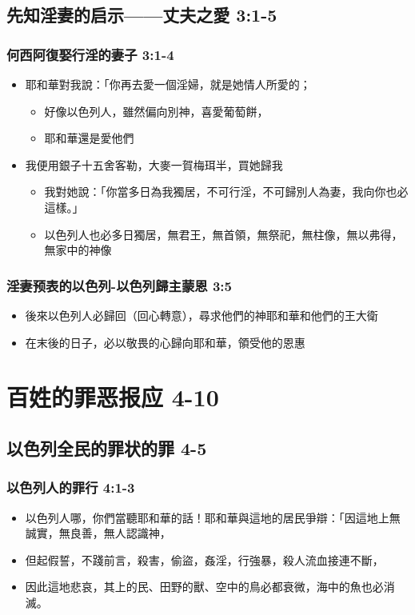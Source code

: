 \subsection{先知淫妻的启示——丈夫之愛 3:1-5}
\subsubsection{何西阿復娶行淫的妻子 3:1-4}
\begin{itemize}
\itemsep-.45em  
\item 耶和華對我說：「你再去愛一個淫婦，就是她情人所愛的；
\begin{itemize}
\itemsep-.45em  
\item 好像以色列人，雖然偏向別神，喜愛葡萄餅，
\item 耶和華還是愛他們
\end{itemize}
\item 我便用銀子十五舍客勒，大麥一賀梅珥半，買她歸我
\begin{itemize}
\itemsep-.45em  
\item 我對她說：「你當多日為我獨居，不可行淫，不可歸別人為妻，我向你也必這樣。」
\item 以色列人也必多日獨居，無君王，無首領，無祭祀，無柱像，無以弗得，無家中的神像
\end{itemize}
\end{itemize}


\subsubsection{淫妻预表的以色列-以色列歸主蒙恩 3:5}
\begin{itemize}
\itemsep-.45em  
\item 後來以色列人必歸回（回心轉意），尋求他們的神耶和華和他們的王大衛
\item 在末後的日子，必以敬畏的心歸向耶和華，領受他的恩惠
\end{itemize}


\section{百姓的罪恶报应 4-10}
\subsection{以色列全民的罪状的罪 4-5}
\subsubsection{以色列人的罪行 4:1-3}
\begin{itemize}
\itemsep-.45em  
\item 以色列人哪，你們當聽耶和華的話！耶和華與這地的居民爭辯：「因這地上無誠實，無良善，無人認識神， 
\item 但起假誓，不踐前言，殺害，偷盜，姦淫，行強暴，殺人流血接連不斷，
\item 因此這地悲哀，其上的民、田野的獸、空中的鳥必都衰微，海中的魚也必消滅。
\end{itemize}

